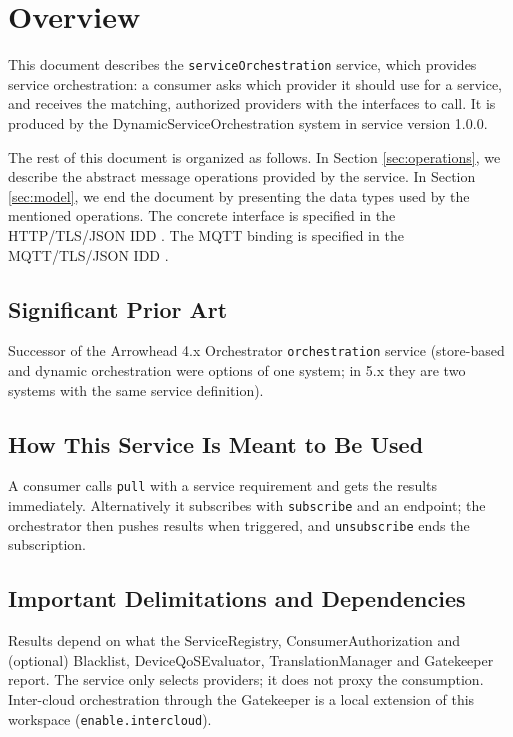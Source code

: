 \documentclass[a4paper]{arrowhead}
\begin{document}
\section{Overview}
\label{sec:overview}

This document describes the \texttt{service\allowbreak{}Orchestration} service, which provides service orchestration: a consumer asks which provider it should use for a service, and receives the matching, authorized providers with the interfaces to call.
It is produced by the DynamicServiceOrchestration system \cite{dso-sysd} in service version 1.0.0.

The rest of this document is organized as follows.
In Section \ref{sec:operations}, we describe the abstract message operations provided by the service.
In Section \ref{sec:model}, we end the document by presenting the data types used by the mentioned operations.
The concrete interface is specified in the HTTP/TLS/JSON IDD \cite{dso-serviceOrchestration-http-idd}. The MQTT binding is specified in the MQTT/TLS/JSON IDD \cite{dso-serviceOrchestration-mqtt-idd}.

\subsection{Significant Prior Art}

Successor of the Arrowhead 4.x Orchestrator \texttt{orchestration} service (store-based and dynamic orchestration were options of one system; in 5.x they are two systems with the same service definition).

\subsection{How This Service Is Meant to Be Used}

A consumer calls \texttt{pull} with a service requirement and gets the results immediately. Alternatively it subscribes with \texttt{subscribe} and an endpoint; the orchestrator then pushes results when triggered, and \texttt{unsubscribe} ends the subscription.

\subsection{Important Delimitations and Dependencies}
\label{sec:delimitations}

Results depend on what the ServiceRegistry, Consumer\allowbreak{}Authorization and (optional) Blacklist, Device\allowbreak{}Qo\allowbreak{}SEvaluator, Translation\allowbreak{}Manager and Gatekeeper report. The service only selects providers; it does not proxy the consumption. Inter-cloud orchestration through the Gatekeeper is a local extension of this workspace (\texttt{enable.\allowbreak{}intercloud}).
\end{document}
